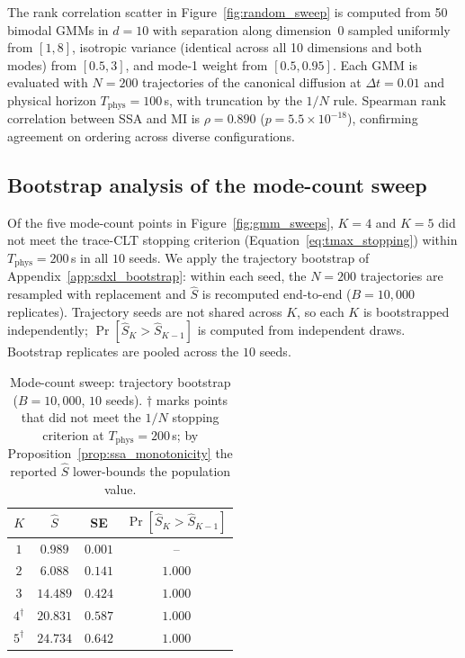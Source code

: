 \documentclass{article}
\begin{document}
The rank correlation scatter in Figure~\ref{fig:random_sweep} is
computed from 50 bimodal GMMs in $d = 10$ with separation along
dimension~0 sampled uniformly from $[1, 8]$, isotropic variance
(identical across all 10 dimensions and both modes) from $[0.5, 3]$,
and mode-1 weight from $[0.5, 0.95]$. Each GMM is evaluated with
$N = 200$ trajectories of the canonical diffusion at $\Delta t = 0.01$
and physical horizon $T_{\mathrm{phys}} = 100$\,s, with truncation by
the $1/N$ rule. Spearman rank correlation between SSA and MI is
$\rho = 0.890$ ($p = 5.5 \times 10^{-18}$), confirming agreement on
ordering across diverse configurations.


\subsection{Bootstrap analysis of the mode-count sweep}
\label{app:gmm_bootstrap}

Of the five mode-count points in Figure~\ref{fig:gmm_sweeps}, $K=4$
and $K=5$ did not meet the trace-CLT stopping criterion
(Equation~\ref{eq:tmax_stopping}) within $T_{\mathrm{phys}} = 200$\,s in
all $10$ seeds. We apply the trajectory bootstrap of
Appendix~\ref{app:sdxl_bootstrap}: within each seed, the $N = 200$
trajectories are resampled with replacement and $\hat S$ is recomputed
end-to-end ($B = 10{,}000$ replicates). Trajectory seeds are not
shared across $K$, so each $K$ is bootstrapped independently;
$\Pr[\hat S_K > \hat S_{K-1}]$ is computed from independent draws.
Bootstrap replicates are pooled across the $10$ seeds.

\begin{table}[H]
\centering
\caption{  Mode-count sweep: trajectory bootstrap
($B = 10{,}000$, $10$ seeds). $\dagger$ marks points that did not meet
the $1/N$ stopping criterion at $T_{\mathrm{phys}} = 200$\,s; by
Proposition~\ref{prop:ssa_monotonicity} the reported $\hat S$
lower-bounds the population value.}
\label{tab:gmm_bootstrap}
 
\begin{tabular}{@{}cccc@{}}
\toprule
$K$ & $\hat S$ & SE & $\Pr[\hat S_K > \hat S_{K-1}]$ \\
\midrule
$1$           & $0.989$  & $0.001$ & --      \\
$2$           & $6.088$  & $0.141$ & $1.000$ \\
$3$           & $14.489$ & $0.424$ & $1.000$ \\
$4^{\dagger}$ & $20.831$ & $0.587$ & $1.000$ \\
$5^{\dagger}$ & $24.734$ & $0.642$ & $1.000$ \\
\bottomrule
\end{tabular}
\end{table}
\end{document}
